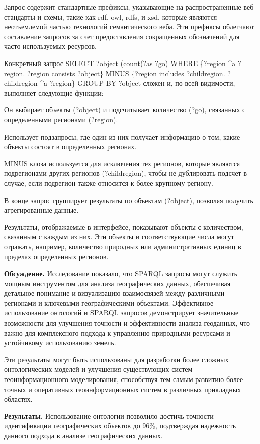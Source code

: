 \begin{multicols}{2}
Запрос содержит стандартные префиксы, указывающие на распространенные
веб-стандарты и схемы, такие как rdf, owl, rdfs, и xsd, которые являются
неотъемлемой частью технологий семантического веба. Эти префиксы
облегчают составление запросов за счет предоставления сокращенных
обозначений для часто используемых ресурсов.

Конкретный запрос SELECT ?object (count(?as ?go) WHERE \{?region \^{}a
?region. ?region consists ?object\} MINUS \{?region includes
?childregion. ?childregion \^{}a ?region\} GROUP BY ?object сложен и, по
всей видимости, выполняет следующие функции:

Он выбирает объекты (?object) и подсчитывает количество (?go), связанных
с определенными регионами (?region).

Использует подзапросы, где один из них получает информацию о том, какие
объекты состоят в определенных регионах.

MINUS клоза используется для исключения тех регионов, которые являются
подрегионами других регионов (?childregion), чтобы не дублировать
подсчет в случае, если подрегион также относится к более крупному
региону.

В конце запрос группирует результаты по объектам (?object), позволяя
получить агрегированные данные.

Результаты, отображаемые в интерфейсе, показывают объекты с количеством,
связанным с каждым из них. Эти объекты и соответствующие числа могут
отражать, например, количество природных или административных единиц в
пределах определенных регионов.

{\bfseries Обсуждение.} Исследование показало, что SPARQL запросы могут
служить мощным инструментом для анализа географических данных,
обеспечивая детальное понимание и визуализацию взаимосвязей между
различными регионами и ключевыми географическими объектами. Эффективное
использование онтологий и SPARQL запросов демонстрирует значительные
возможности для улучшения точности и эффективности анализа геоданных,
что важно для комплексного подхода к управлению природными ресурсами и
устойчивому использованию земель.

Эти результаты могут быть использованы для разработки более сложных
онтологических моделей и улучшения существующих систем
геоинформационного моделирования, способствуя тем самым развитию более
точных и оперативных геоинформационных систем в различных прикладных
областях.

{\bfseries Результаты.} Использование онтологии позволило достичь точности
идентификации географических объектов до 96\%, подтверждая надежность
данного подхода в анализе географических данных.


\end{multicols}
